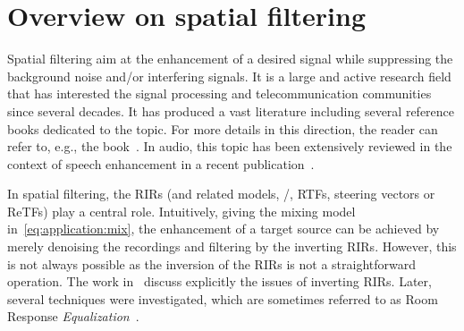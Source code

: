 \section{Overview on spatial filtering}\label{sec:application:filtering}
Spatial filtering aim at the enhancement of a desired signal while suppressing the background noise and/or interfering signals.
It is a large and active research field that has interested the signal processing and telecommunication communities since several decades.
It has produced a vast literature including several reference books dedicated to the topic.
For more details in this direction, the reader can refer to, e.g., the book~.
In audio, this topic has been extensively reviewed in the context of speech enhancement in a recent publication~.

\mynewline
In spatial filtering, the \acp{RIR} (and related models, \eg/, \acp{RTF}, steering vectors or \acp{ReTF}) play a central role.
Intuitively, giving the mixing model in~\cref{eq:application:mix}, the enhancement of a target source can be achieved by merely denoising the recordings and filtering by the inverting \acp{RIR}.
However, this is not always possible as the inversion of the \acp{RIR} is not a straightforward operation.
The work in~ discuss explicitly the issues of inverting \acp{RIR}.
Later, several techniques were investigated, which are sometimes referred to as Room Response \textit{Equalization}~.


